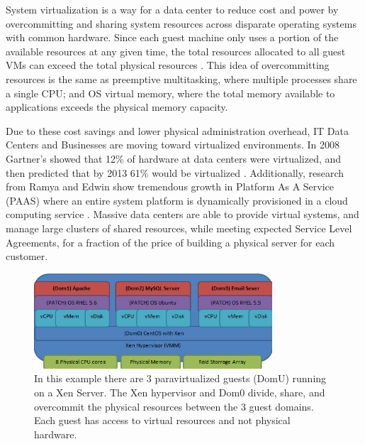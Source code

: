 System virtualization is a way for a data center to reduce cost and power by overcommitting and sharing system resources across disparate operating systems with common hardware.  Since each guest machine only uses a portion of the available resources at any given time, the total resources allocated to all guest VMs can exceed the total physical resources \cite{huber2, amit, buell1}.   This idea of overcommitting resources is the same as preemptive multitasking, where multiple processes share a single CPU; and OS virtual memory, where the total memory available to applications exceeds the physical memory capacity.   

\indent Due to these cost savings and lower physical administration overhead, IT Data Centers and Businesses are moving toward virtualized environments.  In 2008 Gartner’s showed that 12\% of hardware at data centers were virtualized, and then predicted that by 2013 61\% would be virtualized \cite{gartners}.   Additionally, research from Ramya and Edwin show tremendous growth in Platform As A Service (PAAS) where an entire system platform is dynamically provisioned in a cloud computing service \cite{ramya}.   Massive data centers are able to provide virtual systems, and manage large clusters of shared resources, while meeting expected Service Level Agreements, for a fraction of the price of building a physical server for each customer.

\begin{figure}[!b]
  \begin{center}
    \includegraphics[width=3.5in]{images/VirtualizationExample.jpg}
  \end{center}

  \caption{\small In this example there are 3 paravirtualized guests (DomU) running on a Xen Server.  The Xen hypervisor and Dom0 divide, share, and overcommit the physical resources between the 3 guest domains.  Each guest has access to virtual resources and not physical hardware.}
  \label{fig-VirtualizationExample.pdf}
\end{figure}


